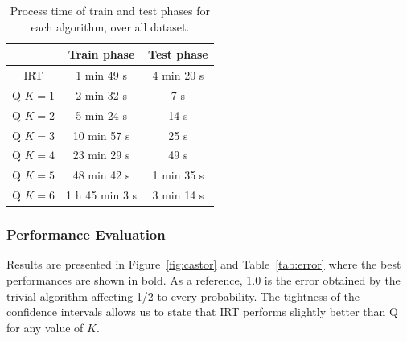 \documentclass{sig-alternate}
\begin{document}
\begin{table}[H]
\small\centering\begin{tabular}{@{}ccc@{}}
& Train phase & Test phase\\
\hline
IRT & 1 min 49 s & 4 min 20 s\\%
Q $K = 1$ & 2 min 32 s & 7 s\\
Q $K = 2$ & 5 min 24 s & 14 s\\
Q $K = 3$ & 10 min 57 s & 25 s\\ %
Q $K = 4$ & 23 min 29 s & 49 s\\ %
Q $K = 5$ & 48 min 42 s & 1 min 35 s\\ %
Q $K = 6$ & 1 h 45 min 3 s & 3 min 14 s %
\end{tabular}
\caption{Process time of train and test phases for each algorithm, over all dataset.}
\label{tab:time}
\end{table}

\subsubsection{Performance Evaluation}

 Results are presented in Figure~\ref{fig:castor} and Table~\ref{tab:error} where the best performances are shown in bold. As a reference, 1.0 is the error obtained by the trivial algorithm affecting 1/2 to every probability. The tightness of the confidence intervals allows us to state that IRT performs slightly better than Q for any value of $K$. %
\end{document}
